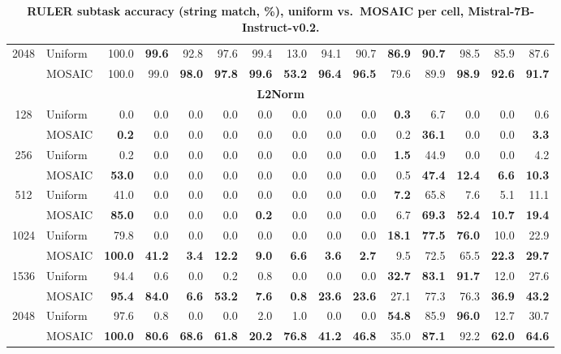 \begin{table}[tp]
\begin{tabular}{@{} c l rrrrrrrrrrrrr @{}}
    \cmidrule(l){1-15}
    \multirow{2}{*}{2048} & Uniform & 100.0 & \textbf{99.6} & 92.8 & 97.6 & 99.4 & 13.0 & 94.1 & 90.7 & \textbf{86.9} & \textbf{90.7} & 98.5 & 85.9 & 87.6 \\
     & MOSAIC & 100.0 & 99.0 & \textbf{98.0} & \textbf{97.8} & \textbf{99.6} & \textbf{53.2} & \textbf{96.4} & \textbf{96.5} & 79.6 & 89.9 & \textbf{98.9} & \textbf{92.6} & \textbf{91.7} \\
    \midrule
    \multicolumn{15}{c}{\textbf{L2Norm}} \\
    \midrule
    \multirow{2}{*}{128} & Uniform & 0.0 & 0.0 & 0.0 & 0.0 & 0.0 & 0.0 & 0.0 & 0.0 & \textbf{0.3} & 6.7 & 0.0 & 0.0 & 0.6 \\
     & MOSAIC & \textbf{0.2} & 0.0 & 0.0 & 0.0 & 0.0 & 0.0 & 0.0 & 0.0 & 0.2 & \textbf{36.1} & 0.0 & 0.0 & \textbf{3.3} \\
    \cmidrule(l){1-15}
    \multirow{2}{*}{256} & Uniform & 0.2 & 0.0 & 0.0 & 0.0 & 0.0 & 0.0 & 0.0 & 0.0 & \textbf{1.5} & 44.9 & 0.0 & 0.0 & 4.2 \\
     & MOSAIC & \textbf{53.0} & 0.0 & 0.0 & 0.0 & 0.0 & 0.0 & 0.0 & 0.0 & 0.5 & \textbf{47.4} & \textbf{12.4} & \textbf{6.6} & \textbf{10.3} \\
    \cmidrule(l){1-15}
    \multirow{2}{*}{512} & Uniform & 41.0 & 0.0 & 0.0 & 0.0 & 0.0 & 0.0 & 0.0 & 0.0 & \textbf{7.2} & 65.8 & 7.6 & 5.1 & 11.1 \\
     & MOSAIC & \textbf{85.0} & 0.0 & 0.0 & 0.0 & \textbf{0.2} & 0.0 & 0.0 & 0.0 & 6.7 & \textbf{69.3} & \textbf{52.4} & \textbf{10.7} & \textbf{19.4} \\
    \cmidrule(l){1-15}
    \multirow{2}{*}{1024} & Uniform & 79.8 & 0.0 & 0.0 & 0.0 & 0.0 & 0.0 & 0.0 & 0.0 & \textbf{18.1} & \textbf{77.5} & \textbf{76.0} & 10.0 & 22.9 \\
     & MOSAIC & \textbf{100.0} & \textbf{41.2} & \textbf{3.4} & \textbf{12.2} & \textbf{9.0} & \textbf{6.6} & \textbf{3.6} & \textbf{2.7} & 9.5 & 72.5 & 65.5 & \textbf{22.3} & \textbf{29.7} \\
    \cmidrule(l){1-15}
    \multirow{2}{*}{1536} & Uniform & 94.4 & 0.6 & 0.0 & 0.2 & 0.8 & 0.0 & 0.0 & 0.0 & \textbf{32.7} & \textbf{83.1} & \textbf{91.7} & 12.0 & 27.6 \\
     & MOSAIC & \textbf{95.4} & \textbf{84.0} & \textbf{6.6} & \textbf{53.2} & \textbf{7.6} & \textbf{0.8} & \textbf{23.6} & \textbf{23.6} & 27.1 & 77.3 & 76.3 & \textbf{36.9} & \textbf{43.2} \\
    \cmidrule(l){1-15}
    \multirow{2}{*}{2048} & Uniform & 97.6 & 0.8 & 0.0 & 0.0 & 2.0 & 1.0 & 0.0 & 0.0 & \textbf{54.8} & 85.9 & \textbf{96.0} & 12.7 & 30.7 \\
     & MOSAIC & \textbf{100.0} & \textbf{80.6} & \textbf{68.6} & \textbf{61.8} & \textbf{20.2} & \textbf{76.8} & \textbf{41.2} & \textbf{46.8} & 35.0 & \textbf{87.1} & 92.2 & \textbf{62.0} & \textbf{64.6} \\
    \bottomrule
  \end{tabular}
  \caption{\textbf{RULER subtask accuracy (string match, \%), uniform vs.\ MOSAIC per cell, Mistral-7B-Instruct-v0.2.}}
  \label{tab:app-ruler-mistral}
\end{table}


